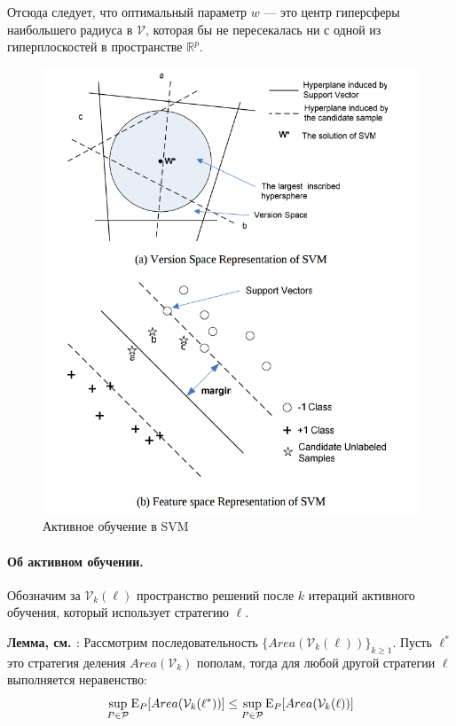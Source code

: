 \documentclass[specialist, 12pt, href]{article}
\begin{document}
Отсюда следует, что оптимальный параметр \(w\) --- это центр гиперсферы
наибольшего радиуса в \(\mathcal{V}\), которая бы не пересекалась ни с
одной из гиперплоскостей в пространстве \(\mathbb{R}^p\).

\begin{figure}[htbp]
\centering
\includegraphics[width=5in]{img/svm+al.png}
\caption{Активное обучение в SVM}
\end{figure}

\paragraph{Об активном
обучении.}

Обозначим за \(\mathcal{V}_k(\ell)\) пространство решений после \(k\) итераций активного обучения,
который использует стратегию \(\ell\).

\textbf{Лемма, см. \cite{TongKoller}}:
Рассмотрим последовательность \(\{Area(\mathcal{V}_k(\ell))\}_{k \geq 1}\).
Пусть  \(\ell^*\) это стратегия деления \(Area(\mathcal{V}_k)\)
пополам, тогда для любой другой стратегии
\(\ell\) выполняется неравенство:
\[\sup_{P \in \mathcal{P}} {\rm E}_P[Area(\mathcal{V}_k(\ell^*))] \leq \sup_{P \in \mathcal{P}} {\rm E}_P[Area(\mathcal{V}_k(\ell))]\]
\end{document}

